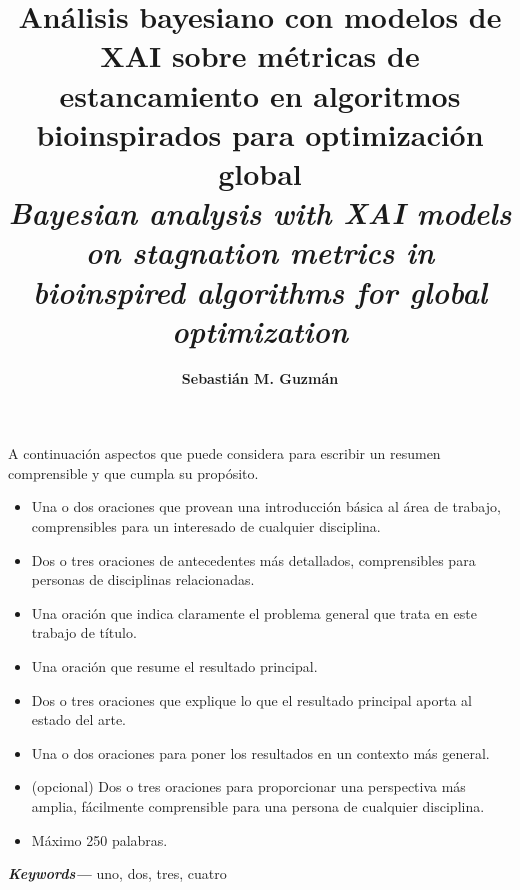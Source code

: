 \documentclass[12pt,letterpaper]{report}
\providecommand{\keywords}[1]
{
  \small
  \textbf{\textit{Keywords---}} #1
}
\def\tablename{Tabla}}
\begin{document}
\title{\textbf{Análisis bayesiano con modelos  de XAI sobre métricas de estancamiento en algoritmos bioinspirados para optimización global}\\
\textit{Bayesian analysis with XAI models on stagnation metrics in bioinspired algorithms for global optimization}}
\author{\textbf{Sebastián M. Guzmán}}

\beforepreface


A continuación aspectos que puede considera para escribir un resumen comprensible y que cumpla su propósito.

\begin{itemize}
    \item Una o dos oraciones que provean una introducción básica al área de trabajo, comprensibles para un interesado de cualquier disciplina.
    \item Dos o tres oraciones de antecedentes más detallados, comprensibles para personas de disciplinas relacionadas.
    \item Una oración que indica claramente el problema general que trata en este trabajo de título.
    \item Una oración que resume el resultado principal.
    \item Dos o tres oraciones que explique lo que el resultado principal aporta al estado del arte.
    \item Una o dos oraciones para poner los resultados en un contexto más general.
    \item (opcional) Dos o tres oraciones para proporcionar una perspectiva más amplia, fácilmente comprensible para una persona de cualquier disciplina.
    \item Máximo 250 palabras.
\end{itemize}

\keywords{uno, dos, tres, cuatro}

\tableofcontents
\newpage


\listoffigures
\newpage

\renewcommand{\listtablename}{Índice de tablas}
\renewcommand{\tablename}{Tabla}
\end{document}
